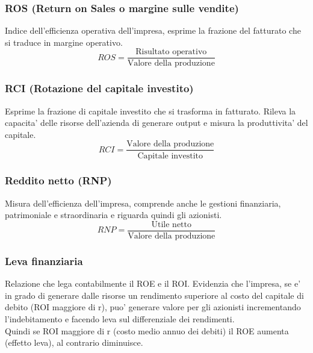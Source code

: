 \documentclass{report}
\begin{document}
	\subsubsection{ROS (Return on Sales o margine sulle vendite)}
	Indice dell'efficienza operativa dell'impresa, esprime la frazione del fatturato che si traduce in margine operativo.
	\[ROS = \frac{\text{Risultato operativo}}{\text{Valore della produzione}}\]
	\subsubsection{RCI (Rotazione del capitale investito)}
	Esprime la frazione di capitale investito che si trasforma in fatturato. Rileva la capacita' delle risorse dell'azienda di generare output e misura la produttivita' del capitale.
	\[RCI = \frac{\text{Valore della produzione}}{\text{Capitale investito}}\]
	\subsubsection{Reddito netto (RNP)}
	Misura dell'efficienza dell'impresa, comprende anche le gestioni finanziaria, patrimoniale e straordinaria e riguarda quindi gli azionisti.
	\[RNP = \frac{\text{Utile netto}}{\text{Valore della produzione}}\]
	\subsubsection{Leva finanziaria}
	Relazione che lega contabilmente il ROE e il ROI. Evidenzia che l'impresa, se e' in grado di generare dalle risorse un rendimento superiore al costo del capitale di debito (ROI maggiore di r), puo' generare valore per gli azionisti incrementando l'indebitamento e facendo leva sul differenziale dei rendimenti.
	\medskip \\Quindi se ROI maggiore di r (costo medio annuo dei debiti) il ROE aumenta (effetto leva), al contrario diminuisce.
	
	
	
	
	
\end{document}

